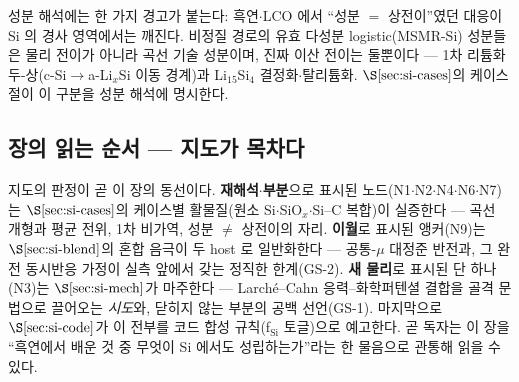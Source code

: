 성분 해석에는 한 가지 경고가 붙는다: 흑연$\cdot$LCO 에서 ``성분 $=$ 상전이''였던 대응이 Si 의 경사
영역에서는 깨진다. 비정질 경로의 유효 다성분 logistic(MSMR-Si) 성분들은 물리 전이가 아니라 곡선 기술
성분이며, 진짜 이산 전이는 둘뿐이다 --- 1차 리튬화 두-상(c-Si$\to$a-Li$_x$Si 이동 경계)과
Li$_{15}$Si$_4$ 결정화$\cdot$탈리튬화. $\S\ref{sec:si-cases}$의 케이스 절이 이 구분을 성분 해석에 명시한다.

\subsection{장의 읽는 순서 --- 지도가 목차다}\label{ssec:si-guide}
지도의 판정이 곧 이 장의 동선이다. \textbf{재해석$\cdot$부분}으로 표시된 노드(N1$\cdot$N2$\cdot$N4$\cdot$N6$\cdot$N7)는
$\S\ref{sec:si-cases}$의 케이스별 활물질(원소 Si$\cdot$SiO$_x$$\cdot$Si--C 복합)이 실증한다 --- 곡선 개형과
평균 전위, 1차 비가역, 성분 $\ne$ 상전이의 자리. \textbf{이월}로 표시된 앵커(N9)는 $\S\ref{sec:si-blend}$의
혼합 음극이 두 host 로 일반화한다 --- 공통-$\mu$ 대정준 반전과, 그 완전 동시반응 가정이 실측 앞에서 갖는
정직한 한계(GS-2). \textbf{새 물리}로 표시된 단 하나(N3)는 $\S\ref{sec:si-mech}$가 마주한다 ---
Larch\'e--Cahn 응력--화학퍼텐셜 결합을 골격 문법으로 끌어오는 \emph{시도}와, 닫히지 않는 부분의 공백
선언(GS-1). 마지막으로 $\S\ref{sec:si-code}$가 이 전부를 코드 합성 규칙(f$_\mathrm{Si}$ 토글)으로
예고한다. 곧 독자는 이 장을 ``흑연에서 배운 것 중 무엇이 Si 에서도 성립하는가''라는 한 물음으로 관통해
읽을 수 있다.

